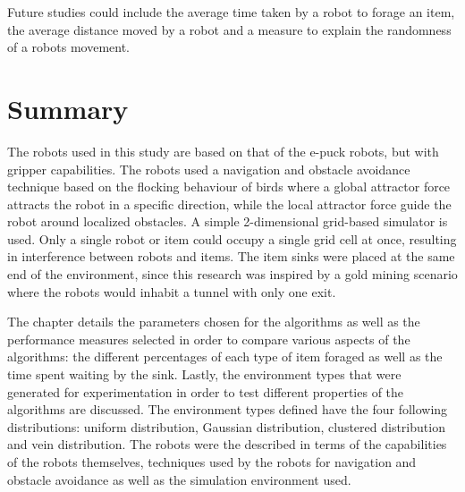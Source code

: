 Future studies could include the average time taken by a robot to forage an item, the average distance moved by a robot and a measure to explain the randomness of a robots movement. 


\section{Summary}
\label{third:summary}
The robots used in this study are based on that of the e-puck robots, but with gripper capabilities. The robots used a navigation and obstacle avoidance technique based on the flocking behaviour of birds where a global attractor force attracts the robot in a specific direction, while the local attractor force guide the robot around localized obstacles. A simple 2-dimensional grid-based simulator is used. Only a single robot or item could occupy a single grid cell at once, resulting in interference between robots and items. The item sinks were placed at the same end of the environment, since this research was inspired by a gold mining scenario where the robots would inhabit a tunnel with only one exit.

The chapter details the parameters chosen for the algorithms as well as the performance measures selected in order to compare various aspects of the algorithms: the different percentages of each type of item foraged as well as the time spent waiting by the sink. Lastly, the environment types that were generated for experimentation in order to test different properties of the algorithms are discussed. The environment types defined have the four following distributions: uniform distribution, Gaussian distribution, clustered distribution and vein distribution. The robots were the described in terms of the capabilities of the robots themselves, techniques used by the robots for navigation and obstacle avoidance  as well as the simulation environment used.


